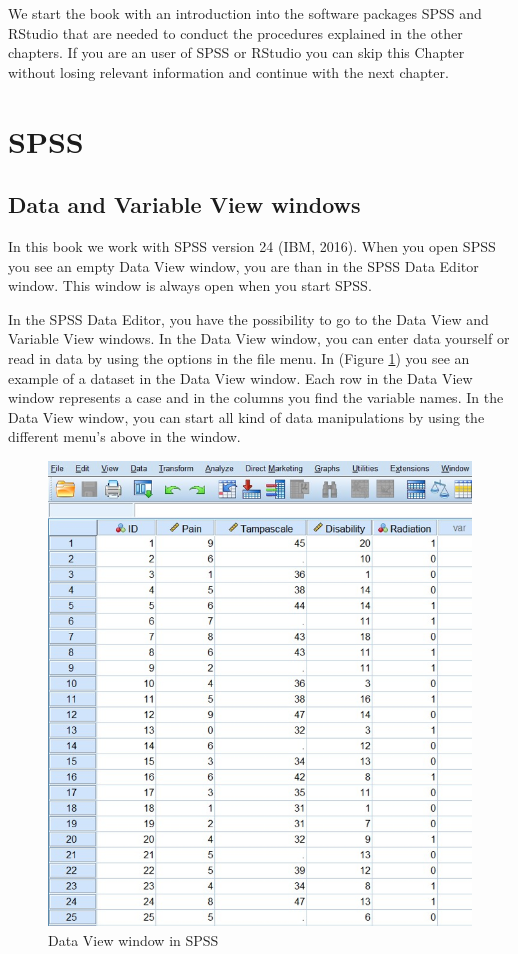 \documentclass[]{book}
\begin{document}
We start the book with an introduction into the software packages SPSS
and RStudio that are needed to conduct the procedures explained in the
other chapters. If you are an user of SPSS or RStudio you can skip this
Chapter without losing relevant information and continue with the next
chapter.

\section{SPSS}\label{spss}

\subsection{Data and Variable View
windows}\label{data-and-variable-view-windows}

In this book we work with SPSS version 24 (IBM, 2016). When you open
SPSS you see an empty Data View window, you are than in the SPSS Data
Editor window. This window is always open when you start SPSS.

In the SPSS Data Editor, you have the possibility to go to the Data View
and Variable View windows. In the Data View window, you can enter data
yourself or read in data by using the options in the file menu. In
(Figure \ref{fig:fig2}) you see an example of a dataset in the Data View
window. Each row in the Data View window represents a case and in the
columns you find the variable names. In the Data View window, you can
start all kind of data manipulations by using the different menu's above
in the window.

\begin{figure}

{\centering \includegraphics[width=0.95\linewidth]{images/fig1.2} 

}

\caption{Data View window in SPSS}\label{fig:fig2}
\end{figure}
\end{document}
